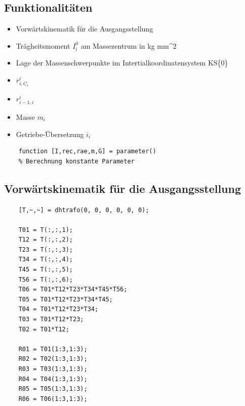 \subsection*{Funktionalitäten}
%
\begin{itemize}
	\setlength{\itemsep}{-1ex}
	\item Vorwärtskinematik für die Ausgangsstellung
	\item Trägheitsmoment $I^{0}_i$ am Massezentrum in kg mm\^{}2
	\item Lage der Massenschwerpunkte im Intertialkoordinatensystem KS\{0\}
	\item $r^{i}_{i,C_i}$
	\item $r^{i}_{i-1,i}$
	\item Masse $m_i$
	\item Getriebe-Übersetzung $i_i$
\end{itemize}
\begin{lstlisting}
	function [I,rec,rae,m,G] = parameter()
	% Berechnung konstante Parameter
\end{lstlisting}
%
\subsection*{Vorwärtskinematik für die Ausgangsstellung}
%
\begin{lstlisting}
	[T,~,~] = dhtrafo(0, 0, 0, 0, 0, 0);
	
	T01 = T(:,:,1);
	T12 = T(:,:,2);
	T23 = T(:,:,3);
	T34 = T(:,:,4);
	T45 = T(:,:,5);
	T56 = T(:,:,6);
	T06 = T01*T12*T23*T34*T45*T56;
	T05 = T01*T12*T23*T34*T45;
	T04 = T01*T12*T23*T34;
	T03 = T01*T12*T23;
	T02 = T01*T12;
	
	R01 = T01(1:3,1:3);
	R02 = T02(1:3,1:3);
	R03 = T03(1:3,1:3);
	R04 = T04(1:3,1:3);
	R05 = T05(1:3,1:3);
	R06 = T06(1:3,1:3);
\end{lstlisting}
%
